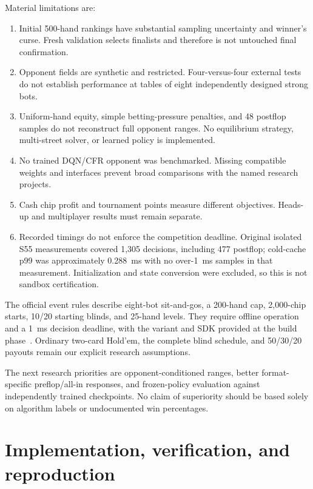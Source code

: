 \documentclass[11pt,letterpaper]{article}
\begin{document}
Material limitations are:
\begin{enumerate}
\item Initial 500-hand rankings have substantial sampling uncertainty and
winner's curse. Fresh validation selects finalists and therefore is not
untouched final confirmation.
\item Opponent fields are synthetic and restricted. Four-versus-four external
tests do not establish performance at tables of eight independently designed
strong bots.
\item Uniform-hand equity, simple betting-pressure penalties, and 48 postflop
samples do not reconstruct full opponent ranges. No equilibrium strategy,
multi-street solver, or learned policy is implemented.
\item No trained DQN/CFR opponent was benchmarked. Missing compatible weights
and interfaces prevent broad comparisons with the named research projects.
\item Cash chip profit and tournament points measure different objectives.
Heads-up and multiplayer results must remain separate.
\item Recorded timings do not enforce the competition deadline. Original
isolated S55 measurements covered 1,305 decisions, including 477 postflop;
cold-cache p99 was approximately 0.288~ms with no over-1~ms samples in that
measurement. Initialization and state conversion were excluded, so this is
not sandbox certification.
\end{enumerate}

The official event rules describe eight-bot sit-and-gos, a 200-hand cap,
2,000-chip starts, 10/20 starting blinds, and 25-hand levels. They require
offline operation and a 1~ms decision deadline, with the variant and SDK
provided at the build phase~\cite{competition}. Ordinary two-card Hold'em,
the complete blind schedule, and 50/30/20 payouts remain our explicit
research assumptions.

The next research priorities are opponent-conditioned ranges, better
format-specific preflop/all-in responses, and frozen-policy evaluation
against independently trained checkpoints. No claim of superiority should
be based solely on algorithm labels or undocumented win percentages.

\section{Implementation, verification, and reproduction}
\end{document}
